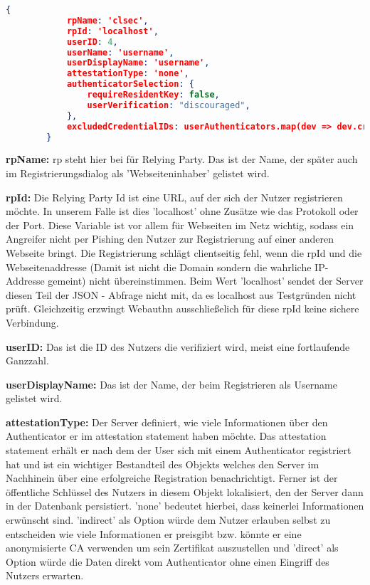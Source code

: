 \begin{enumerate}
\begin{itemize}
 \begin{lstlisting}[language=json,firstnumber=1]
        {
            rpName: 'clsec',
            rpId: 'localhost',
            userID: 4,
            userName: 'username',
            userDisplayName: 'username',
            attestationType: 'none',
            authenticatorSelection: {
                requireResidentKey: false,
                userVerification: "discouraged",
            },
            excludedCredentialIDs: userAuthenticators.map(dev => dev.credentialID),
        }
\end{lstlisting}

\textbf{rpName:} rp steht hier bei für Relying Party. Das ist der Name, der später auch im Registrierungsdialog als 'Webseiteninhaber' gelistet wird.

\textbf{rpId:} Die Relying Party Id ist eine URL, auf der sich der Nutzer registrieren möchte. In unserem Falle ist dies 'localhost' ohne Zusätze wie das Protokoll oder der Port. Diese Variable ist vor allem für Webseiten im Netz wichtig, sodass ein Angreifer nicht per Pishing den Nutzer zur Registrierung auf einer anderen Webseite bringt. Die Registrierung schlägt clientseitig fehl, wenn die rpId und die Webseitenaddresse (Damit ist nicht die Domain sondern die wahrliche IP-Addresse gemeint) nicht übereinstimmen. Beim Wert 'localhost' sendet der Server diesen Teil der JSON - Abfrage nicht mit, da es localhost aus Testgründen nicht prüft. Gleichzeitig erzwingt Webauthn ausschließelich für diese rpId keine sichere Verbindung.

\textbf{userID:} Das ist die ID des Nutzers die verifiziert wird, meist eine fortlaufende Ganzzahl.

\textbf{userDisplayName:} Das ist der Name, der beim Registrieren als Username gelistet wird.

\textbf{attestationType:} Der Server definiert, wie viele Informationen über den Authenticator er im attestation statement haben möchte. Das attestation statement erhält er nach dem der User sich mit einem Authenticator registriert hat und ist ein wichtiger Bestandteil des Objekts welches den Server im Nachhinein über eine erfolgreiche Registration benachrichtigt. Ferner ist der öffentliche Schlüssel des Nutzers in diesem Objekt lokalisiert, den der Server dann in der Datenbank persistiert. 'none' bedeutet hierbei, dass keinerlei Informationen erwünscht sind. 'indirect' als Option würde dem Nutzer erlauben selbst zu entscheiden wie viele Informationen er preisgibt bzw. könnte er eine anonymisierte CA verwenden um sein Zertifikat auszustellen und 'direct' als Option würde die Daten direkt vom Authenticator ohne einen Eingriff des Nutzers erwarten.


\end{itemize}
\end{enumerate}
